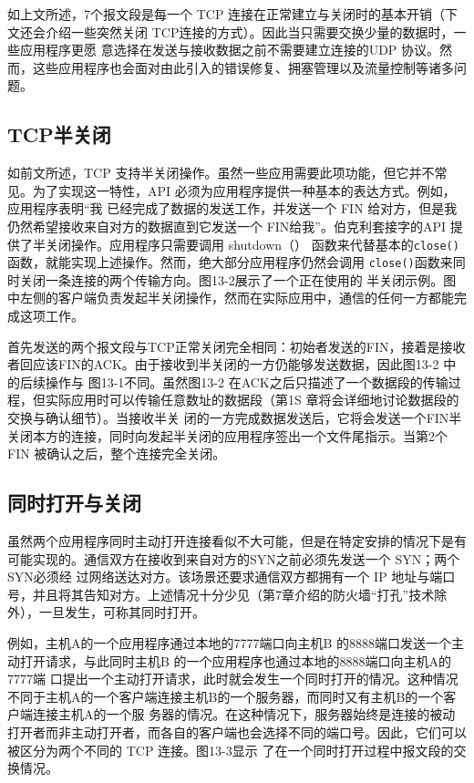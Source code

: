 如上文所述，7个报文段是每一个 TCP 连接在正常建立与关闭时的基本开销（下文还会介绍一些突然关闭 TCP连接的方式）。因此当只需要交换少量的数据时，一些应用程序更愿
意选择在发送与接收数据之前不需要建立连接的UDP 协议。然而，这些应用程序也会面对由此引入的错误修复、拥塞管理以及流量控制等诸多问题。
\subsection{TCP半关闭}
如前文所述，TCP 支持半关闭操作。虽然一些应用需要此项功能，但它并不常见。为了实现这一特性，API 必须为应用程序提供一种基本的表达方式。例如，应用程序表明“我
已经完成了数据的发送工作，并发送一个 FIN 给对方，但是我仍然希望接收来自对方的数据直到它发送一个 FIN给我”。伯克利套接字的API 提供了半关闭操作。应用程序只需要调用
shutdown（） 函数来代替基本的\verb|close()|函数，就能实现上述操作。然而，绝大部分应用程序仍然会调用 \verb|close()|函数来同时关闭一条连接的两个传输方向。图13-2展示了一个正在使用的
半关闭示例。图中左侧的客户端负责发起半关闭操作，然而在实际应用中，通信的任何一方都能完成这项工作。

首先发送的两个报文段与TCP正常关闭完全相同：初始者发送的FIN，接着是接收者回应该FIN的ACK。由于接收到半关闭的一方仍能够发送数据，因此图13-2 中的后续操作与
图13-1不同。虽然图13-2 在ACK之后只描述了一个数据段的传输过程，但实际应用时可以传输任意数址的数据段（第1S 章将会详细地讨论数据段的交换与确认细节）。当接收半关
闭的一方完成数据发送后，它将会发送一个FIN半关闭本方的连接，同时向发起半关闭的应用程序签出一个文件尾指示。当第2个FIN 被确认之后，整个连接完全关闭。

\subsection{同时打开与关闭}
虽然两个应用程序同时主动打开连接看似不大可能，但是在特定安排的情况下是有可能实现的。通信双方在接收到来自对方的SYN之前必须先发送一个 SYN；两个 SYN必须经
过网络送达对方。该场景还要求通信双方都拥有一个 IP 地址与端口号，并且将其告知对方。上述情况十分少见（第7章介绍的防火墙“打孔”技术除外），一旦发生，可称其同时打开。

例如，主机A的一个应用程序通过本地的7777端口向主机B 的8888端口发送一个主动打开请求，与此同时主机B 的一个应用程序也通过本地的8888端口向主机A的7777端
口提出一个主动打开请求，此时就会发生一个同时打开的情况。这种情况不同于主机A的一个客户端连接主机B的一个服务器，而同时又有主机B的一个客户端连接主机A的一个服
务器的情况。在这种情况下，服务器始终是连接的被动打开者而非主动打开者，而各自的客户端也会选择不同的端口号。因此，它们可以被区分为两个不同的 TCP 连接。图13-3显示
了在一个同时打开过程中报文段的交换情况。

